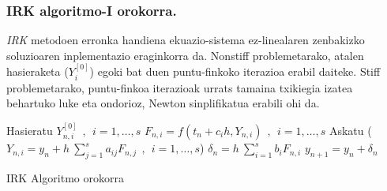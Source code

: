 \subsubsection*{IRK algoritmo-I orokorra.}

\emph{IRK} metodoen erronka handiena ekuazio-sistema ez-linealaren zenbakizko soluzioaren inplementazio eraginkorra  da. Nonstiff problemetarako, atalen hasieraketa ($Y_i^{[0]}$) egoki bat duen puntu-finkoko iterazioa erabil daiteke. Stiff problemetarako, puntu-finkoa iterazioak urrats tamaina txikiegia izatea behartuko luke eta ondorioz, Newton sinplifikatua erabili ohi da.  

\begin{algorithm}[H]
 \BlankLine
  {
   \BlankLine
   Hasieratu  $Y_{n,i}^{[0]} \ \ , \ \ i=1,\dots,s $\;
    \BlankLine
   {
    \BlankLine 
    $F_{n,i}=f(t_n+c_ih,Y_{n,i}) \ \ , \ \  i=1,\dots,s$\;
    Askatu ($Y_{n,i}=y_{n}+ h \ \sum\limits_{j=1}^{s} a_{ij} F_{n,j}  \ \ , \ \  i=1,\dots,s$) \;  
   }
   \BlankLine
    $\delta_n=h \ \sum\limits_{i=1}^{s} b_i F_{n,i}$\;
    $y_{n+1}=y_{n}+ \delta_n $\;
   \BlankLine
 }
 \caption{IRK Algoritmo orokorra}\label{alg:IRK1}
\end{algorithm}



